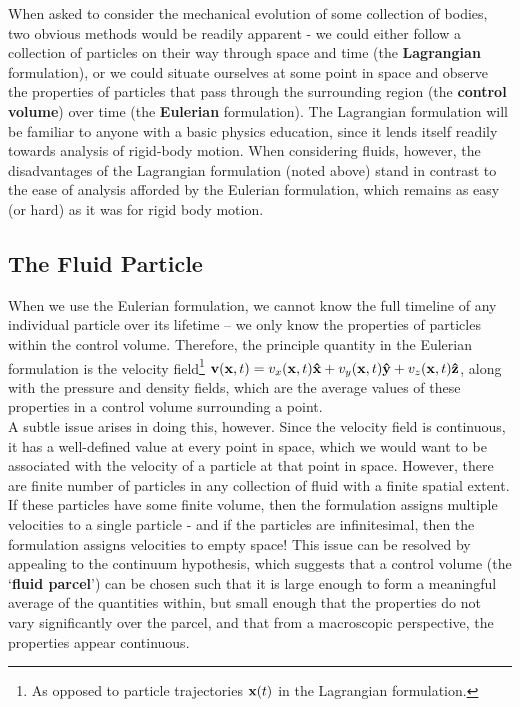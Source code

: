 When asked to consider the mechanical evolution of some collection of bodies, two obvious methods would be readily apparent - we could either follow a collection of particles on their way through space and time (the {\bf Lagrangian} formulation), or we could situate ourselves at some point in space and observe the properties of particles that pass through the surrounding region (the {\bf control volume}) over time (the {\bf Eulerian} formulation). The Lagrangian formulation will be familiar to anyone with a basic physics education, since it lends itself readily towards analysis of rigid-body motion. When considering fluids, however, the disadvantages of the Lagrangian formulation (noted above) stand in contrast to the ease of analysis afforded by the Eulerian formulation, which remains as easy (or hard) as it was for rigid body motion. 

\subsection{The Fluid Particle}
When we use the Eulerian formulation, we cannot know the full timeline of any individual particle over its lifetime -- we only know the properties of particles within the control volume. Therefore, the principle quantity in the Eulerian formulation is the {velocity field}\footnote{As opposed to particle trajectories $\mathbf{x}(t)$ in the Lagrangian formulation.} $\mathbf{v}(\mathbf{x},t) = v_x(\mathbf{x},t) \mathbf{\hat{x}} + v_y (\mathbf{x},t)\mathbf{\hat{y}} + v_z(\mathbf{x},t) \mathbf{\hat{z}}$, along with the pressure and density fields, which are the average values of these properties in a control volume surrounding a point. \\

A subtle issue arises in doing this, however. Since the velocity field is continuous, it has a well-defined value at every point in space, which we would want to be associated with the velocity of a particle at that point in space. However, there are finite number of particles in any collection of fluid with a finite spatial extent. If these particles have some finite volume, then the formulation assigns multiple velocities to a single particle - and if the particles are infinitesimal, then the formulation assigns velocities to empty space! This issue can be resolved by appealing to the continuum hypothesis, which suggests that a control volume (the `{\bf fluid parcel}') can be chosen such that it is large enough to form a meaningful average of the quantities within, but small enough that the properties do not vary significantly over the parcel, and that from a macroscopic perspective, the properties appear continuous. \\

